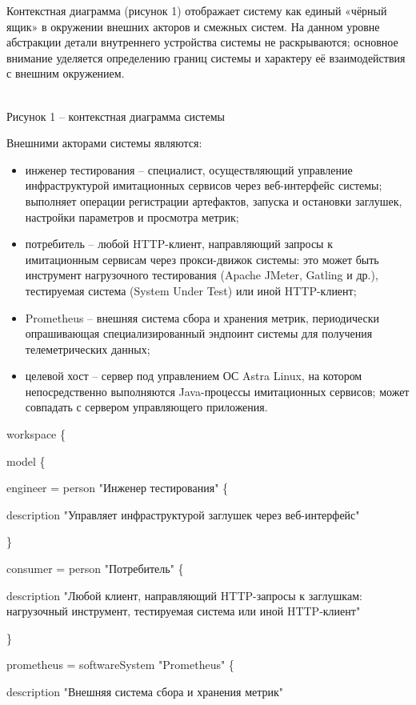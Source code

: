 \documentclass[
]{article}
\begin{document}
Контекстная диаграмма (рисунок 1) отображает систему как единый «чёрный
ящик» в окружении внешних акторов и смежных систем. На данном уровне
абстракции детали внутреннего устройства системы не раскрываются;
основное внимание уделяется определению границ системы и характеру её
взаимодействия с внешним окружением.

\\
Рисунок 1 -- контекстная диаграмма системы

Внешними акторами системы являются:

\begin{itemize}
\item
  инженер тестирования -- специалист, осуществляющий управление
  инфраструктурой имитационных сервисов через веб-интерфейс системы;
  выполняет операции регистрации артефактов, запуска и остановки
  заглушек, настройки параметров и просмотра метрик;
\item
  потребитель -- любой HTTP-клиент, направляющий запросы к имитационным
  сервисам через прокси-движок системы: это может быть инструмент
  нагрузочного тестирования (Apache JMeter, Gatling и др.), тестируемая
  система (System Under Test) или иной HTTP-клиент;
\item
  Prometheus -- внешняя система сбора и хранения метрик, периодически
  опрашивающая специализированный эндпоинт системы для получения
  телеметрических данных;
\item
  целевой хост -- сервер под управлением ОС Astra Linux, на котором
  непосредственно выполняются Java-процессы имитационных сервисов; может
  совпадать с сервером управляющего приложения.
\end{itemize}

workspace \{

model \{

engineer = person "Инженер тестирования" \{

description "Управляет инфраструктурой заглушек через веб-интерфейс"

\}

consumer = person "Потребитель" \{

description "Любой клиент, направляющий HTTP-запросы к заглушкам:
нагрузочный инструмент, тестируемая система или иной HTTP-клиент"

\}

prometheus = softwareSystem "Prometheus" \{

description "Внешняя система сбора и хранения метрик"
\end{document}
